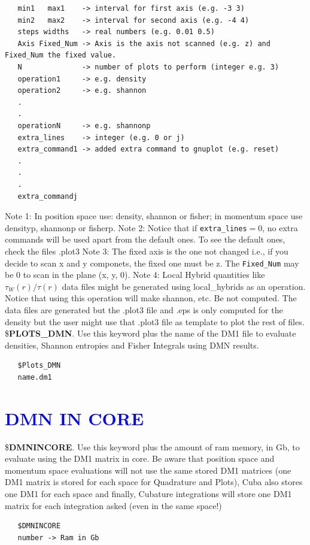 \documentclass[10pt,a4paper]{article}
\newcommand{\tbl}[1]{{\textcolor{blue}{#1}}}
\begin{document}
{\begin{verbatim}
   min1   max1    -> interval for first axis (e.g. -3 3)
   min2   max2    -> interval for second axis (e.g. -4 4)
   steps widths   -> real numbers (e.g. 0.01 0.5)
   Axis Fixed_Num -> Axis is the axis not scanned (e.g. z) and Fixed_Num the fixed value.  
   N              -> number of plots to perform (integer e.g. 3)
   operation1     -> e.g. density
   operation2     -> e.g. shannon
   .
   .
   operationN     -> e.g. shannonp
   extra_lines    -> integer (e.g. 0 or j)
   extra_command1 -> added extra command to gnuplot (e.g. reset)
   .
   .
   .
   extra_commandj
\end{verbatim}
Note 1: In position space use: density, shannon or fisher; in momentum space use densityp, shannonp or fisherp. \newline
Note 2: Notice that if {\tt extra\_lines$=0$}, no extra commands will be used apart from the default ones. To see the default ones, check the files .plot3 \newline
Note 3: The fixed axis is the one not changed i.e., if you decide to scan x and y componets, the fixed one must be z. The {\tt Fixed\_Num} may be 0 to scan in the plane (x, y, 0).\newline 
Note 4: Local Hybrid quantities like $\tau _W (r)/\tau (r)$ data files might be generated using local\_hybrids as an operation. Notice that using this operation will make shannon, etc. Be not computed. The data files are generated but the .plot3 file and .eps is only computed for the density but the user might use that .plot3 file as template to plot the rest of files.\newline  
\newline
\newline 
\noindent \$\textbf{PLOTS\_DMN}. Use this keyword plus the name of the DM1 file to evaluate densities, Shannon entropies and Fisher Integrals using DMN results.\newline 
\begin{verbatim}
   $Plots_DMN
   name.dm1
\end{verbatim}
\section{\tbl{\textbf{DMN IN CORE}}}
\noindent \$\textbf{DMNINCORE}. Use this keyword plus the amount of ram memory, in Gb, to evaluate using the DM1 matrix in core. Be aware that position space and momentum space evaluations will not use the same stored DM1 matrices (one DM1 matrix is stored for each space for Quadrature and Plots), Cuba also stores one DM1 for each space and finally, Cubature integrations will store one DM1 matrix for each integration asked (even in the same space!)\newline 
\begin{verbatim}
   $DMNINCORE
   number -> Ram in Gb
\end{verbatim}
}
\end{document}
